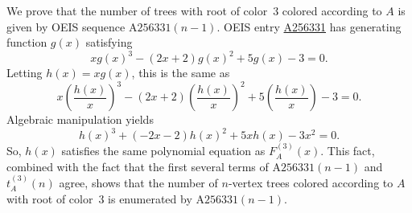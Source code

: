 \documentclass[12pt]{amsart}
\newcommand{\seqnum}[1]{\href{https://oeis.org/#1}{#1}}
\newcommand{\gff}[2]{F_{#2}^{(#1)}(x)}
\newcommand{\gfa}[1]{\gff{#1}{A}}
\begin{document}
\begin{description}
\begin{itemize}
\end{itemize}
    \item[Discussion] We prove that the number of trees with root of color~3 colored according to $A$ is given by OEIS sequence $\text{A256331}(n-1)$.
    OEIS entry \seqnum{A256331} has generating function $g(x)$ satisfying
    \[
    xg(x)^3 - (2x+2)g(x)^2 + 5g(x) - 3=0.
    \]
    Letting $h(x)=xg(x)$, this is the same as
    \[
    x\left(\frac{h(x)}{x}\right)^3 - (2x+2)\left(\frac{h(x)}{x}\right)^2 + 5\left(\frac{h(x)}{x}\right) - 3=0.
    \]
    Algebraic manipulation yields
    \[
    h(x)^3+(-2x - 2)h(x)^2+5xh(x)-3x^2=0.
    \]
    So, $h(x)$ satisfies the same polynomial equation as $\gfa{3}$. This fact, combined with the fact that the first several terms of $\text{A256331}(n-1)$ and $t_A^{(3)}(n)$ agree, shows that the number of $n$-vertex trees colored according to $A$ with root of color~3 is enumerated by $\text{A256331}(n-1)$.
\end{description}
\end{document}

